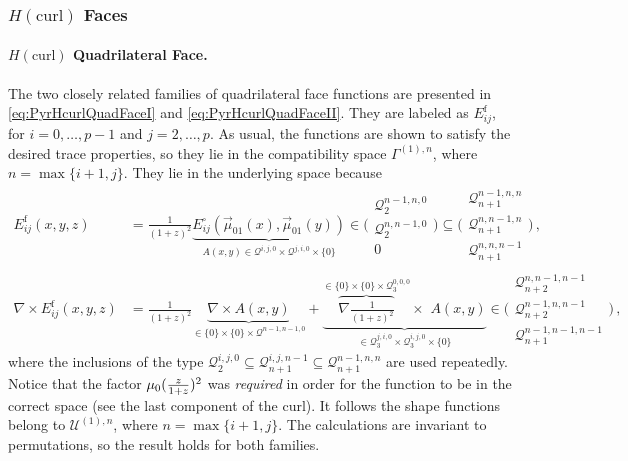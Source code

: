\subsubsection{\texorpdfstring{$H(\mathrm{curl})$}{Hcurl} Faces}

\paragraph{\texorpdfstring{$H(\mathrm{curl})$}{Hcurl} Quadrilateral Face.}
The two closely related families of quadrilateral face functions are presented in \eqref{eq:PyrHcurlQuadFaceI} and \eqref{eq:PyrHcurlQuadFaceII}. 
They are labeled as $E_{ij}^\mathrm{f}$, for $i=0,\ldots,p-1$ and $j=2,\ldots,p$.
As usual, the functions are shown to satisfy the desired trace properties, so they lie in the compatibility space $\Gamma^{(1),n}$, where $n=\max\{i+1,j\}$.
They lie in the underlying space because
\begin{equation}
\begin{aligned}
	E_{ij}^\mathrm{f}(x,y,z)&\!=\!\textstyle{\frac{1}{(1+z)^2}}
			\underbrace{E_{ij}^\square(\vec{\mu}_{01}(x),\vec{\mu}_{01}(y))}_{A(x,y)
				\in\mathcal{Q}^{i,j,0}\!\times\!\mathcal{Q}^{j,i,0}\!\times\!\{0\}}
					\!\in\!\Bigg(\begin{smallmatrix}\mathcal{Q}_2^{n-1,n,0}\\[2pt]\mathcal{Q}_2^{n,n-1,0}\\[2pt]0\end{smallmatrix}\Bigg)
						\subseteq\Bigg(\begin{smallmatrix}\mathcal{Q}_{n+1}^{n-1,n,n}\\[2pt]\mathcal{Q}_{n+1}^{n,n-1,n}\\[2pt]
							\mathcal{Q}_{n+1}^{n,n,n-1}\end{smallmatrix}\Bigg)\,,\\
	\nabla\!\times\! E_{ij}^\mathrm{f}(x,y,z)&\!=\!\textstyle{\frac{1}{(1+z)^2}}\!\!\!\!\!\!
		\underbrace{\nabla\times A(x,y)}_{\in\{0\}\!\times\!\{0\}\!\times\!\mathcal{Q}^{n-1,n-1,0}}\!\!\!\!\!\!
				+\underbrace{\overbrace{\nabla\textstyle{\frac{1}{(1+z)^2}}}^{\in\{0\}\!\times\!\{0\}\!\times\!\mathcal{Q}_{3}^{0,0,0}}
					\!\!\!\!\times\,\, A(x,y)}_{\in\mathcal{Q}_{3}^{j,i,0}\!\times\!\mathcal{Q}_{3}^{i,j,0}\!\times\!\{0\}}
						\!\in\!\Bigg(\begin{smallmatrix}\mathcal{Q}_{n+2}^{n,n-1,n-1}\\[2pt]\mathcal{Q}_{n+2}^{n-1,n,n-1}\\[2pt]
							\mathcal{Q}_{n+1}^{n-1,n-1,n-1}\end{smallmatrix}\Bigg)\,,
	\label{eq:PyrHcurlQuadFaceProof}
\end{aligned}
\end{equation}
where the inclusions of the type $\mathcal{Q}_2^{i,j,0}\subseteq\mathcal{Q}_{n+1}^{i,j,n-1}\subseteq\mathcal{Q}_{n+1}^{n-1,n,n}$ are used repeatedly.
Notice that the factor $\mu_0(\textstyle{\frac{z}{1+z}})^2$ was \textit{required} in order for the function to be in the correct space (see the last component of the curl).
It follows the shape functions belong to $\mathcal{U}^{(1),n}$, where $n=\max\{i+1,j\}$.
The calculations are invariant to permutations, so the result holds for both families.

